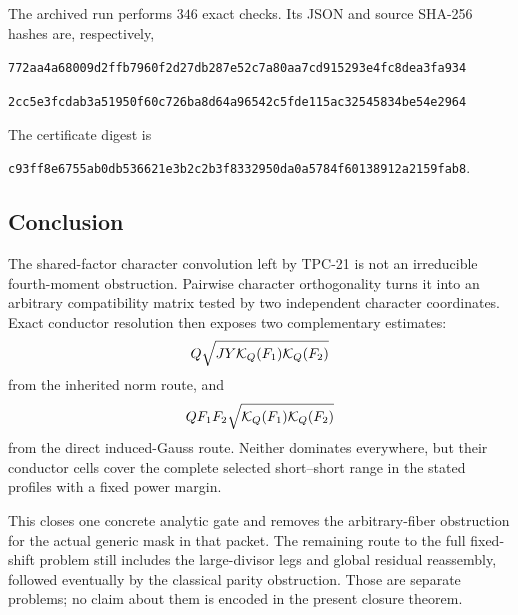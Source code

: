 The archived run performs \(346\) exact checks.  Its JSON and source
SHA-256 hashes are, respectively,
\begin{center}
\nolinkurl{772aa4a68009d2ffb7960f2d27db287e52c7a80aa7cd915293e4fc8dea3fa934}

\nolinkurl{2cc5e3fcdab3a51950f60c726ba8d64a96542c5fde115ac32545834be54e2964}
\end{center}
The certificate digest is
\begin{center}
\nolinkurl{c93ff8e6755ab0db536621e3b2c2b3f8332950da0a5784f60138912a2159fab8}.
\end{center}

\subsection{Conclusion}

The shared-factor character convolution left by TPC-21 is not an
irreducible fourth-moment obstruction.  Pairwise character
orthogonality turns it into an arbitrary compatibility matrix tested by
two independent character coordinates.  Exact conductor resolution
then exposes two complementary estimates:
\[
 Q\sqrt{JY\mathcal K_Q(F_1)\mathcal K_Q(F_2)}
\]
from the inherited norm route, and
\[
 QF_1F_2\sqrt{\mathcal K_Q(F_1)\mathcal K_Q(F_2)}
\]
from the direct induced-Gauss route.  Neither dominates everywhere, but
their conductor cells cover the complete selected short--short range in
the stated profiles with a fixed power margin.

This closes one concrete analytic gate and removes the arbitrary-fiber
obstruction for the actual generic mask in that packet.  The remaining
route to the full fixed-shift problem still includes the large-divisor
legs and global residual reassembly, followed eventually by the
classical parity obstruction.  Those are separate problems; no claim
about them is encoded in the present closure theorem.
